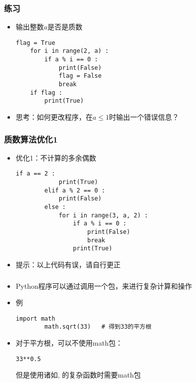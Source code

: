 \begin{frame} [fragile]
	\frametitle{练习}
	\linespread{1.25}
	\begin{itemize}
	\item 输出整数$a$是否是质数
	\begin{lstlisting}[style=pythonstyle, gobble=4]
	flag = True
	for i in range(2, a) :
		if a % i == 0 :
			print(False)
			flag = False
			break
	if flag :
		print(True)
	\end{lstlisting}
	\item 思考：如何更改程序，在$a \le 1$时输出一个错误信息？
	\end{itemize}
\end{frame}

\begin{frame} [fragile]
	\frametitle{质数算法优化1}
	\linespread{1.25}
	\begin{itemize}
	\item 优化1：不计算的多余偶数
		\begin{lstlisting}[style=pythonstyle, gobble=8]
		if a == 2 :
			print(True)
		elif a % 2 == 0 :
			print(False)
		else :
			for i in range(3, a, 2) :
				if a % i == 0 :
					print(False)
					break
				print(True)
		\end{lstlisting}
	\item 提示：以上代码有误，请自行更正
	\end{itemize}
\end{frame}

\begin{frame} [fragile]
	\frametitle{}
	\linespread{1.25}
	\begin{itemize}
	\item Python程序可以通过调用一个包，来进行复杂计算和操作
	\item 例
		\begin{lstlisting}[style=pythonstyle, gobble=8, texcl]
		import math
		math.sqrt(33)	# 得到33的平方根
		\end{lstlisting}
	\item 对于平方根，可以不使用math包：
		\begin{lstlisting}[style=pythonstyle, gobble=8]
		33**0.5
		\end{lstlisting}
		但是使用诸如, 的复杂函数时需要math包
	\end{itemize}
\end{frame}

